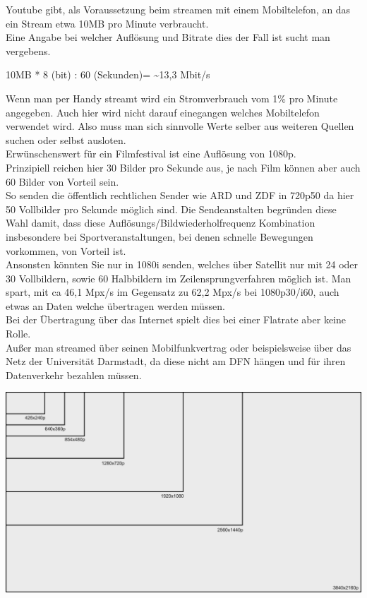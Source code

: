 
Youtube gibt, als Voraussetzung beim streamen mit einem Mobiltelefon, an das ein Stream etwa 10MB pro Minute verbraucht. \\
Eine Angabe bei welcher Auflösung und Bitrate dies der Fall ist sucht man vergebens. \\

\begin{tcolorbox}[colback=fulda_green!50!white,colframe=fulda_green,title=Berechnung der benötigten Datenrate]
  10MB * 8 (bit) : 60 (Sekunden)= \textasciitilde 13,3 Mbit/s
\end{tcolorbox}
Wenn man per Handy streamt wird ein Stromverbrauch vom 1\% pro Minute angegeben. Auch hier wird nicht darauf einegangen welches Mobiltelefon verwendet wird.
Also muss man sich sinnvolle Werte selber aus weiteren Quellen suchen oder selbst ausloten. \\

Erwünschenswert für ein Filmfestival ist eine Auflösung von 1080p. \\
Prinzipiell reichen hier 30 Bilder pro Sekunde aus, je nach Film können aber auch 60 Bilder von Vorteil sein. \\
So senden die öffentlich rechtlichen Sender wie ARD und ZDF in 720p50 da hier 50 Vollbilder pro Sekunde möglich sind. Die Sendeanstalten begründen diese Wahl damit, dass diese Auflösungs/Bildwiederholfrequenz Kombination insbesondere bei Sportveranstaltungen, bei denen schnelle Bewegungen vorkommen, von Vorteil ist.\\
Ansonsten könnten Sie nur in 1080i senden, welches über Satellit nur mit 24 oder 30 Vollbildern, sowie 60 Halbbildern im Zeilensprungverfahren möglich ist.
Man spart, mit ca 46,1 Mpx/s im Gegensatz zu 62,2 Mpx/s bei 1080p30/i60, auch etwas an Daten welche übertragen werden müssen.\\

Bei der Übertragung über das Internet spielt dies bei einer Flatrate aber keine Rolle. \\
Außer man streamed über seinen Mobilfunkvertrag oder beispielsweise über das Netz der Universität Darmstadt, da diese nicht am DFN hängen und für ihren Datenverkehr bezahlen müssen.


\includegraphics[width=\textwidth]{./pictures/resolutions.png}

